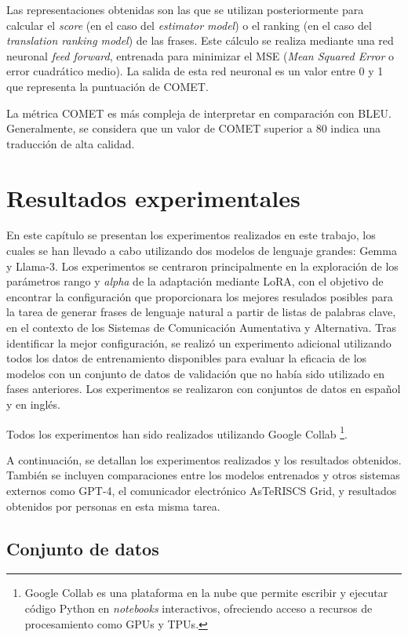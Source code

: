\documentclass[11pt,spanish,listoffigures,listoftables]{tfgetsinf}
\begin{document}
Las representaciones obtenidas son las que se utilizan posteriormente para calcular el \textit{score} (en el caso del \textit{estimator model}) o el ranking (en el caso del \textit{translation ranking model}) de las frases. Este cálculo se realiza mediante una red neuronal \textit{feed forward}, entrenada para minimizar el MSE (\textit{Mean Squared Error} o error cuadrático medio). La salida de esta red neuronal es un valor entre 0 y 1 que representa la puntuación de COMET.

La métrica COMET es más compleja de interpretar en comparación con BLEU. Generalmente, se considera que un valor de COMET superior a 80 indica una traducción de alta calidad.

\chapter{Resultados experimentales} \label{cap4}

En este capítulo se presentan los experimentos realizados en este trabajo, los cuales se han llevado a cabo utilizando dos modelos de lenguaje grandes: Gemma y Llama-3. Los experimentos se centraron principalmente en la exploración de los parámetros rango y \textit{alpha} de la adaptación mediante LoRA, con el objetivo de encontrar la configuración que proporcionara los mejores resulados posibles para la tarea de generar frases de lenguaje natural a partir de listas de palabras clave, en el contexto de los Sistemas de Comunicación Aumentativa y Alternativa. Tras identificar la mejor configuración, se realizó un experimento adicional utilizando todos los datos de entrenamiento disponibles para evaluar la eficacia de los modelos con un conjunto de datos de validación que no había sido utilizado en fases anteriores. Los experimentos se realizaron con conjuntos de datos en español y en inglés.

Todos los experimentos han sido realizados utilizando Google Collab \footnote{Google Collab es una plataforma  en la nube que permite escribir y ejecutar código Python en \textit{notebooks} interactivos, ofreciendo acceso a recursos de procesamiento como GPUs y TPUs.}.

A continuación, se detallan los experimentos realizados y los resultados obtenidos. También se incluyen comparaciones entre los modelos entrenados y otros sistemas externos como GPT-4, el comunicador electrónico AsTeRISCS Grid, y resultados obtenidos por personas en esta misma tarea.

\section{Conjunto de datos}
\end{document}
